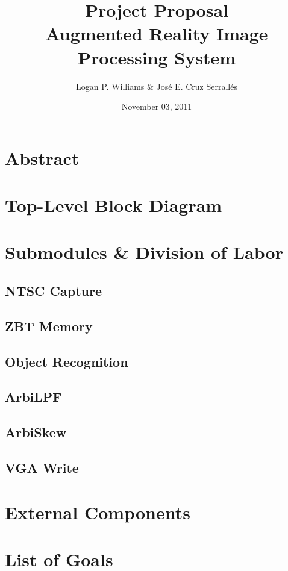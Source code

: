 \documentclass{article}
\begin{document}
\title{Project Proposal\\Augmented Reality Image Processing System}
\author{Logan P. Williams \& Jos\'{e} E. Cruz Serrall\'{e}s}
\date{November 03, 2011}
\maketitle

\section{Abstract}

\section{Top-Level Block Diagram}

\section{Submodules \& Division of Labor}
\subsection{NTSC Capture}

\subsection{ZBT Memory}

\subsection{Object Recognition}

\subsection{ArbiLPF}

\subsection{ArbiSkew}

\subsection{VGA Write}

\section{External Components}

\section{List of Goals}
\end{document}

